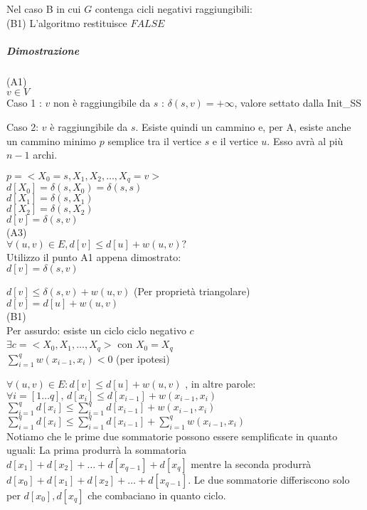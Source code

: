 Nel caso B in cui $G$ contenga cicli negativi raggiungibili: \\
(B1) L'algoritmo restituisce $FALSE$

\subparagraph{Dimostrazione}

(A1) \\
$v \in V$ \\
Caso 1 : $v$ non è raggiungibile da $s$ : $ \delta(s,v) = + \infty $, valore settato dalla Init\_SS

Caso 2: $v$ è raggiungibile da $s$. Esiste quindi un cammino e, per A, esiste anche un cammino minimo $p$ semplice tra il vertice $s$ e il vertice $u$. Esso avrà al più $n-1$ archi.

$p = <X_0=s, X_1, X_2, \ldots, X_q=v>$ \\
$d[X_0] = \delta(s,X_0) = \delta(s,s)$ \\
$d[X_1] = \delta(s,X_1)$ \\
$d[X_2] = \delta(s,X_2)$ \\
$d[v] = \delta(s,v)$ \\

(A3) \\
$\forall (u,v) \in E, d[v] \leq d[u] + w(u,v) ? $\\
Utilizzo il punto A1 appena dimostrato:\\
$d[v] = \delta(s,v)$

$d[v] \leq \delta(s,v) + w(u,v)$ (Per proprietà triangolare)\\
$d[v] = d[u] + w(u,v)$ \\

(B1) \\
Per assurdo: esiste un ciclo ciclo negativo $c$ \\
$\exists c = <X_0,X_1,\ldots,X_q>$ con $X_0 =  X_q$ \\
$\sum_{i=1}^{q}{w(x_{i-1},x_i)} < 0$ (per ipotesi)

$\forall (u,v) \in E : d[v] \leq d[u] + w(u,v)$ , in altre parole: \\
$\forall i = [1\ldots q],\,d[x_i] \leq d[x_{i-1}] + w(x_{i-1},x_i)$ \\

$\sum_{i=1}^q{d[x_i]} \leq \sum_{i=1}^q{d[x_{i-1}] + w(x_{i-1},x_i)}$ \\

$\sum_{i=1}^q{d[x_i]} \leq \sum_{i=1}^q{d[x_{i-1}]} + \sum_{i=1}^q{w(x_{i-1},x_i)}$ \\

Notiamo che le prime due sommatorie possono essere semplificate in quanto uguali: La prima produrrà la sommatoria $d[x_1] + d[x_2] +\ldots + d[x_{q-1}] + d[x_q]$ mentre la seconda produrrà  $d[x_0] + d[x_1] + d[x_2] +\ldots + d[x_{q-1}]$. Le due sommatorie differiscono solo per $d[x_0],d[x_q]$ che combaciano in quanto ciclo.

